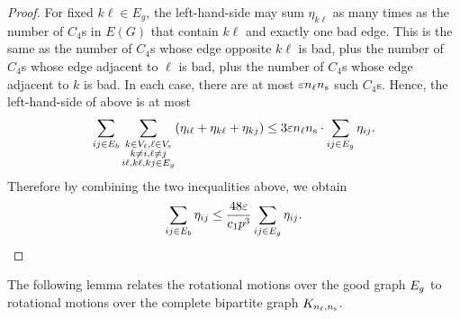 \begin{proof}
For fixed $k\ell\in E_{g}$, the left-hand-side may sum $\eta_{k\ell}$
as many times as the number of $C_4$s in $E(G)$ that contain $k\ell$ and exactly one bad edge.  This is the same as the number of $C_4$s whose edge opposite $k\ell$ is bad, plus the number of $C_4$s whose edge adjacent to $\ell$ is bad, plus the number of $C_4$s whose edge adjacent to $k$ is bad.   In each case, there are at most $\varepsilon n_\ell n_\text{s}$ such $C_4$s.
Hence, the left-hand-side of above is at most 
\[
	\sum_{ij\in E_{b}}
	\sum_{\substack{k \in V_\ell, \ell \in V_\text{s}\\k\neq i,\ell \neq j\\i\ell, k\ell, kj\in E_{g}}}(\eta_{i\ell}+\eta_{k\ell} + \eta_{kj})
	\le 3 \varepsilon n_\ell n_\text{s}\cdot\sum_{ij\in E_{g}}\eta_{ij}.
\]
Therefore by combining the two inequalities above, we obtain 
\[
	\sum_{ij\in E_{b}}\eta_{ij}
	\le\frac{48\eps}{c_{1}p^{3}}\sum_{ij\in E_{g}}\eta_{ij}. %
	\qedhere
\]
\end{proof}

The following lemma relates the rotational motions over the good graph $E_g$ to rotational motions over the complete bipartite graph $K_{n_\ell, n_\text{s}}$.

